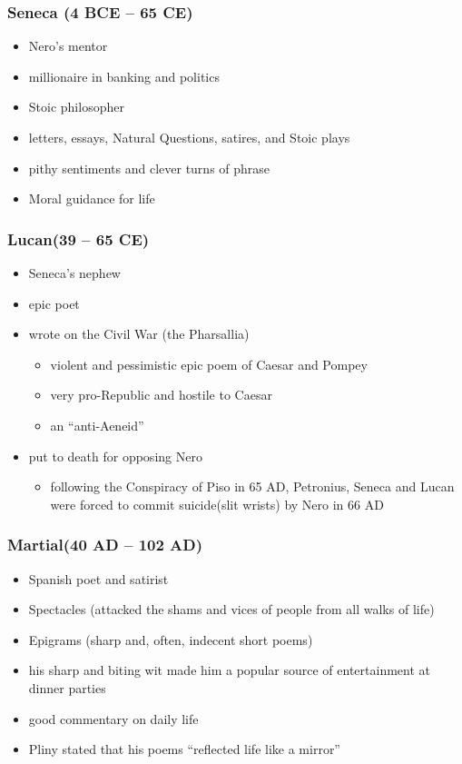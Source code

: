 \documentclass[12pt, twoside]{article}
\begin{document}
\subsubsection{Seneca (4 BCE – 65 CE)}
\begin{itemize}
\item Nero's mentor
\item millionaire in banking and politics
\item Stoic philosopher
\item letters, essays, Natural Questions, satires, and Stoic plays
\item pithy sentiments and clever turns of phrase
\item Moral guidance for life
\end{itemize}

\subsubsection{Lucan(39 – 65 CE)}
\begin{itemize}
\item Seneca’s nephew
\item epic poet
\item wrote on the Civil War (the Pharsallia)
	\begin{itemize}
	\item violent and pessimistic epic poem of Caesar and Pompey
	\item very pro-Republic and hostile to Caesar
	\item an “anti-Aeneid”
	\end{itemize}
\item put to death for opposing Nero
	\begin{itemize}
	\item following the Conspiracy of Piso in 65 AD, Petronius, Seneca and Lucan were forced to commit suicide(slit wrists) by Nero in 66 AD
	\end{itemize}
\end{itemize}

\subsubsection{Martial(40 AD – 102 AD)}
\begin{itemize}
\item Spanish poet and satirist
\item Spectacles (attacked the shams and vices of people from all walks of life)
\item Epigrams (sharp and, often, indecent short poems) 
\item his sharp and biting wit made him a popular source of entertainment at dinner parties
\item good commentary on daily life
\item Pliny stated that his poems “reflected life like a mirror”
\end{itemize}
\end{document}
